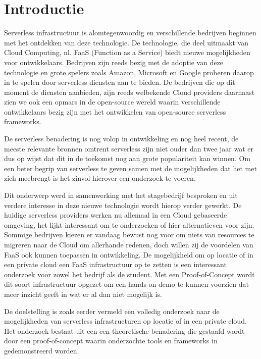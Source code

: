 
\section{Introductie} %
\label{sec:introductie}
Serverless infrastructuur is alomtegenwoordig en verschillende bedrijven beginnen met het ontdekken van deze technologie. De technologie, die deel uitmaakt van Cloud Computing, nl. FaaS (Function as a Service)  biedt nieuwe mogelijkheden voor ontwikkelaars. Bedrijven zijn reeds bezig met de adoptie van deze technologie en grote spelers zoals Amazon, Microsoft en Google proberen daarop in te spelen door serverless diensten aan te bieden. De bedrijven die op dit moment de diensten aanbieden, zijn reeds welbekende Cloud providers daarnaast zien we ook een opmars in de open-source wereld waarin verschillende ontwikkelaars bezig zijn met het ontwikkelen van open-source serverless frameworks.


De serverless benadering is nog volop in ontwikkeling en nog heel recent, de meeste relevante bronnen omtrent serverless zijn niet ouder dan twee jaar wat er dus op wijst dat dit in de toekomst nog aan grote populariteit kan winnen. Om een beter begrip van serverless te geven samen met de mogelijkheden dat het met zich meebrengt is het zinvol hierover een onderzoek te voeren. 


Dit onderwerp werd in samenwerking met het stagebedrijf besproken en uit verdere interesse in deze nieuwe technologie wordt hierop verder gewerkt. De huidige serverless providers werken nu allemaal in een Cloud gebaseerde omgeving, het lijkt interessant om te onderzoeken of hier alternatieven voor zijn. Sommige bedrijven kiezen er vandaag bewust nog voor om niets van resources te migreren naar de Cloud om allerhande redenen, doch willen zij de voordelen van FaaS ook kunnen toepassen in ontwikkeling. De mogelijkheid om op locatie of in een private cloud een FaaS infrastructuur op te zetten is een interessant onderzoek voor zowel het bedrijf als de student. Met een Proof-of-Concept wordt dit soort infrastructuur opgezet om een hands-on demo te kunnen voorzien dat meer inzicht geeft in wat er al dan niet mogelijk is.


De doelstelling is zoals eerder vermeld een volledig onderzoek naar de mogelijkheden van serverless infrastructuren op locatie of in een private cloud. Het onderzoek bestaat uit een een theoretische benadering die gestaafd wordt door een proof-of-concept waarin onderzochte tools en frameworks in gedemonstreerd worden.


